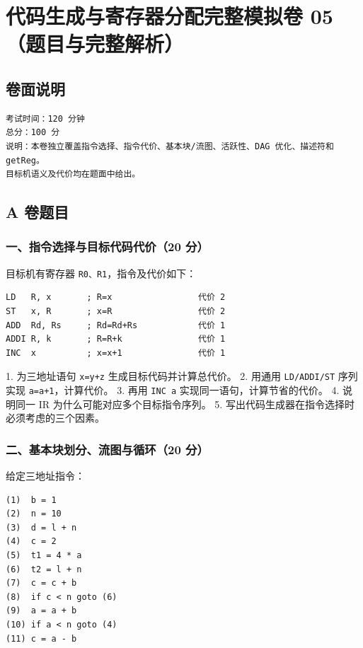 \documentclass[UTF8]{ctexart}
\begin{document}
\section*{代码生成与寄存器分配完整模拟卷 05（题目与完整解析）}

\subsection*{卷面说明}

\begin{Verbatim}[fontsize=\small,breaklines=true]
考试时间：120 分钟
总分：100 分
说明：本卷独立覆盖指令选择、指令代价、基本块/流图、活跃性、DAG 优化、描述符和 getReg。
目标机语义及代价均在题面中给出。
\end{Verbatim}

\subsection*{A 卷题目}

\subsubsection*{一、指令选择与目标代码代价（20 分）}

目标机有寄存器 \texttt{R0、R1}，指令及代价如下：

\begin{Verbatim}[fontsize=\small,breaklines=true]
LD   R, x       ; R=x                 代价 2
ST   x, R       ; x=R                 代价 2
ADD  Rd, Rs     ; Rd=Rd+Rs            代价 1
ADDI R, k       ; R=R+k               代价 1
INC  x          ; x=x+1               代价 1
\end{Verbatim}

1. 为三地址语句 \texttt{x=y+z} 生成目标代码并计算总代价。 2. 用通用 \texttt{LD/ADDI/ST} 序列实现 \texttt{a=a+1}，计算代价。 3. 再用 \texttt{INC a} 实现同一语句，计算节省的代价。 4. 说明同一 IR 为什么可能对应多个目标指令序列。 5. 写出代码生成器在指令选择时必须考虑的三个因素。

\subsubsection*{二、基本块划分、流图与循环（20 分）}

给定三地址指令：

\begin{Verbatim}[fontsize=\small,breaklines=true]
(1)  b = 1
(2)  n = 10
(3)  d = l + n
(4)  c = 2
(5)  t1 = 4 * a
(6)  t2 = l + n
(7)  c = c + b
(8)  if c < n goto (6)
(9)  a = a + b
(10) if a < n goto (4)
(11) c = a - b
\end{Verbatim}
\end{document}
